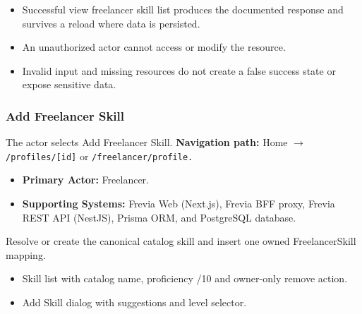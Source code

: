 \begin{itemize}[leftmargin=1.6em,topsep=3pt,itemsep=2pt,parsep=0pt,label=$\bullet$]
    \item Successful view freelancer skill list produces the documented response and survives a reload where data is persisted.
    \item An unauthorized actor cannot access or modify the resource.
    \item Invalid input and missing resources do not create a false success state or expose sensitive data.
\end{itemize}

\subsubsection{Add Freelancer Skill}

The actor selects Add Freelancer Skill.\newline
\textbf{Navigation path:} Home $\rightarrow$ \texttt{/\allowbreak{}profiles/\allowbreak{}[id]} or \texttt{/\allowbreak{}freelancer/\allowbreak{}profile.}


\begin{itemize}[leftmargin=1.6em,topsep=3pt,itemsep=2pt,parsep=0pt,label=$\bullet$]
    \item \textbf{Primary Actor:} Freelancer.
    \item \textbf{Supporting Systems:} Frevia Web (Next.js), Frevia BFF proxy, Frevia REST API (NestJS), Prisma ORM, and PostgreSQL database.
\end{itemize}

\noindent Resolve or create the canonical catalog skill and insert one owned FreelancerSkill mapping.

\begin{itemize}[leftmargin=1.6em,topsep=3pt,itemsep=2pt,parsep=0pt,label=$\bullet$]
    \item Skill list with catalog name, proficiency /10 and owner-only remove action.
    \item Add Skill dialog with suggestions and level selector.
\end{itemize}

